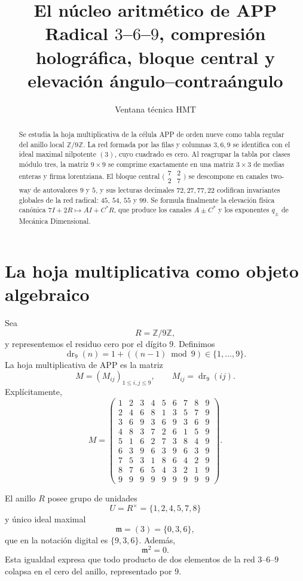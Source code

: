 \documentclass[11pt,a4paper]{article}
\title{\bfseries El núcleo aritmético de APP\\
\large Radical $3$--$6$--$9$, compresión holográfica, bloque central y elevación ángulo--contraángulo}
\author{Ventana técnica HMT}
\date{}
\newcommand{\dr}{\operatorname{dr}_9}
\newcommand{\Z}{\mathbb Z}
\begin{document}
\maketitle

\begin{abstract}
Se estudia la hoja multiplicativa de la célula APP de orden nueve como tabla regular del anillo local $\Z/9\Z$. La red formada por las filas y columnas $3,6,9$ se identifica con el ideal maximal nilpotente $(3)$, cuyo cuadrado es cero. Al reagrupar la tabla por clases módulo tres, la matriz $9\times9$ se comprime exactamente en una matriz $3\times3$ de medias enteras y firma lorentziana. El bloque central $\bigl(\begin{smallmatrix}7&2\\2&7\end{smallmatrix}\bigr)$ se descompone en canales two-way de autovalores $9$ y $5$, y sus lecturas decimales $72,27,77,22$ codifican invariantes globales de la red radical: $45$, $54$, $55$ y $99$. Se formula finalmente la elevación física canónica $7I+2R\mapsto AI+C^\ast R$, que produce los canales $A\pm C^\ast$ y los exponentes $q_\pm$ de Mecánica Dimensional.
\end{abstract}

\section{La hoja multiplicativa como objeto algebraico}

Sea
\[
R=\Z/9\Z,
\]
y representemos el residuo cero por el dígito $9$. Definimos
\[
\dr(n)=1+((n-1)\bmod 9)\in\{1,\dots,9\}.
\]
La hoja multiplicativa de APP es la matriz
\[
M=(M_{ij})_{1\le i,j\le9},\qquad M_{ij}=\dr(ij).
\]
Explícitamente,
\[
M=
\begin{pmatrix}
1&2&3&4&5&6&7&8&9\\
2&4&6&8&1&3&5&7&9\\
3&6&9&3&6&9&3&6&9\\
4&8&3&7&2&6&1&5&9\\
5&1&6&2&7&3&8&4&9\\
6&3&9&6&3&9&6&3&9\\
7&5&3&1&8&6&4&2&9\\
8&7&6&5&4&3&2&1&9\\
9&9&9&9&9&9&9&9&9
\end{pmatrix}.
\]

El anillo $R$ posee grupo de unidades
\[
U=R^\times=\{1,2,4,5,7,8\}
\]
y único ideal maximal
\[
\mathfrak m=(3)=\{0,3,6\},
\]
que en la notación digital es $\{9,3,6\}$. Además,
\[
\mathfrak m^2=0.
\]
Esta igualdad expresa que todo producto de dos elementos de la red $3$--$6$--$9$ colapsa en el cero del anillo, representado por $9$.
\end{document}
